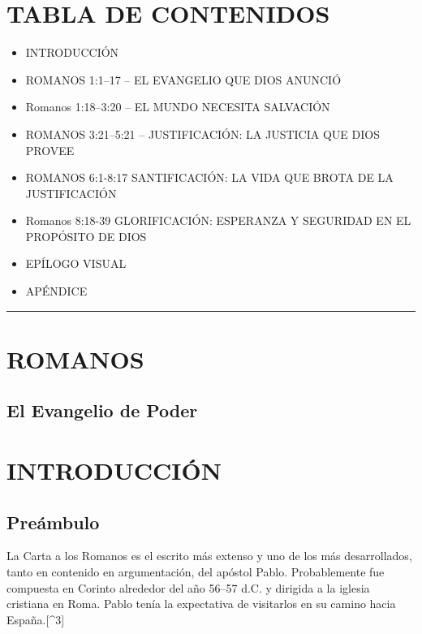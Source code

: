 \section{TABLA DE CONTENIDOS}\label{tabla-de-contenidos}

\begin{itemize}
\item
  INTRODUCCIÓN
\item
  ROMANOS 1:1--17 -- EL EVANGELIO QUE DIOS ANUNCIÓ
\item
  Romanos 1:18--3:20 -- EL MUNDO NECESITA SALVACIÓN
\item
  ROMANOS 3:21--5:21 -- JUSTIFICACIÓN: LA JUSTICIA QUE DIOS PROVEE
\item
  ROMANOS 6:1-8:17 SANTIFICACIÓN: LA VIDA QUE BROTA DE LA JUSTIFICACIÓN
\item
  Romanos 8:18-39 GLORIFICACIÓN: ESPERANZA Y SEGURIDAD EN EL PROPÓSITO
  DE DIOS
\item
  EPÍLOGO VISUAL
\item
  APÉNDICE
\end{itemize}

\begin{center}\rule{0.5\linewidth}{0.5pt}\end{center}

\section{ROMANOS}\label{romanos}

\subsection{El Evangelio de Poder}\label{el-evangelio-de-poder}

\section{INTRODUCCIÓN}\label{introducciuxf3n}

\subsection{Preámbulo}\label{preuxe1mbulo}

La Carta a los Romanos es el escrito más extenso y uno de los más
desarrollados, tanto en contenido  en argumentación, del
apóstol Pablo. Probablemente fue compuesta en Corinto alrededor del año
56--57 d.C. y dirigida a la iglesia cristiana en Roma. Pablo tenía la
expectativa de visitarlos en su camino hacia España.{[}\^{}3{]}

